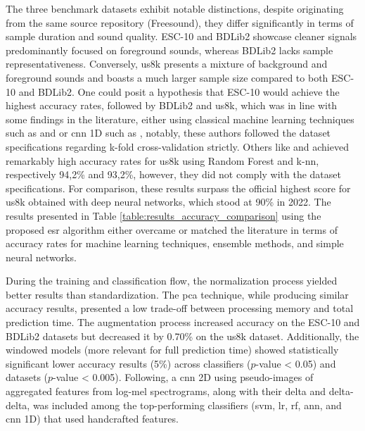 The three benchmark datasets exhibit notable distinctions, despite originating from the same source repository (Freesound), they differ significantly in terms of sample duration and sound quality. ESC-10 and BDLib2 showcase cleaner signals predominantly focused on foreground sounds, whereas BDLib2 lacks sample representativeness. Conversely, \gls{us8k} presents a mixture of background and foreground sounds and boasts a much larger sample size compared to both ESC-10 and BDLib2. One could posit a hypothesis that ESC-10 would achieve the highest accuracy rates, followed by BDLib2 and \gls{us8k}, which was in line with some findings in the literature, either using classical machine learning techniques such as \textcite{Silva2019} and \textcite{Bountourakis2019} or \gls{cnn} 1D such as \textcite{Vandendriessche2021}, notably, these authors followed the dataset specifications regarding k-fold cross-validation strictly. Others like \textcite{Lhoest2021} and \textcite{Luz2021} achieved remarkably high accuracy rates for \gls{us8k} using Random Forest and \gls{k-nn}, respectively 94,2\% and 93,2\%, however, they did not comply with the dataset specifications. For comparison, these results surpass the official highest score for \gls{us8k} obtained with deep neural networks, which stood at 90\% in 2022. The results presented in Table \ref{table:results_accuracy_comparison} using the proposed \gls{esr} algorithm either overcame or matched the literature in terms of accuracy rates for machine learning techniques, ensemble methods, and simple neural networks.


During the training and classification flow, the normalization process yielded better results than standardization. The \gls{pca} technique, while producing similar accuracy results, presented a low trade-off between processing memory and total prediction time. The augmentation process increased accuracy on the ESC-10 and BDLib2 datasets but decreased it by 0.70\% on the \gls{us8k} dataset. Additionally, the windowed models (more relevant for full prediction time) showed statistically significant lower accuracy results (5\%) across classifiers ($p$-value < 0.05) and datasets ($p$-value < 0.005). Following, a \gls{cnn} 2D using pseudo-images of aggregated features from log-mel spectrograms, along with their delta and delta-delta, was included among the top-performing classifiers (\gls{svm}, \gls{lr}, \gls{rf}, \gls{ann}, and \gls{cnn} 1D) that used handcrafted features.

